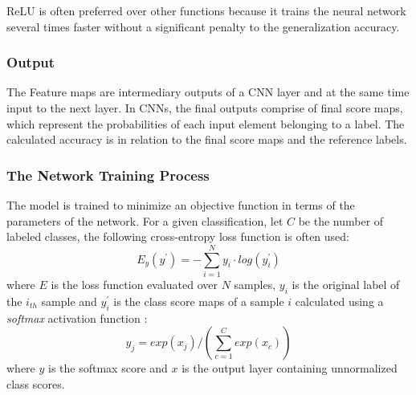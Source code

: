 ReLU is often preferred over other functions because it trains the neural network several times faster without a significant penalty to the generalization accuracy.
\subsubsection{Output}
The Feature maps are intermediary outputs of a CNN layer and at the same time input to the next layer. In CNNs, the final outputs comprise of final score maps, which represent the probabilities of each input element belonging to a label. The calculated accuracy is in relation to the final score maps and the reference labels.
\subsubsection{The Network Training Process}
The model is trained to minimize an objective function in terms of the parameters of the network. For a given classification, let $C$ be the number of labeled classes, the following cross-entropy loss function \cite{de2005tutorial} is often used:
\begin{equation}
E_y (y^{'} )=-\sum_{i=1}^{N}y_i\cdot log(y_i^{'})
\end{equation}
where $E$ is the loss function evaluated over $N$ samples, $y_i$ is the original label of the $i_{th}$ sample and $y_i^{'}$ is the class score maps of a sample $i$ calculated using a \textit{softmax} activation function \cite{dunne1997pairing}:
\begin{equation}
y_j=exp(x_j)/(\sum_{c=1}^{C}exp(x_c))
\end{equation}
where $y$ is the softmax score and $x$ is the output layer containing unnormalized class scores.

